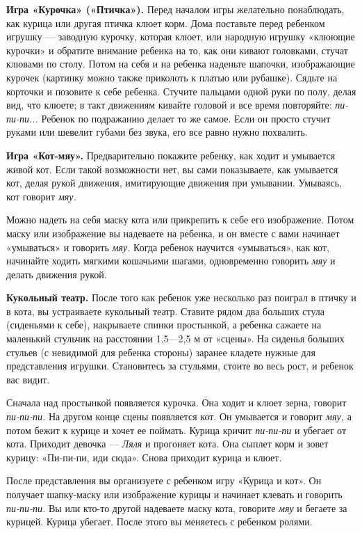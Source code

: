 \documentclass{book}
\renewcommand{\emph}[1]{\textit{#1}}
\begin{document}
\textbf{Игра «Курочка» («Птичка»).} Перед началом игры желательно
понаблюдать, как курица или другая птичка клюет корм. Дома поставьте
перед ребенком игрушку --- заводную курочку, которая клюет, или народную
игрушку «клюющие курочки» и обратите внимание ребенка на то, как они
кивают головками, стучат клювами по столу. Потом на себя и на ребенка
наденьте шапочки, изображающие курочек (картинку можно также приколоть к
платью или рубашке). Сядьте на корточки и позовите к себе ребенка.
Стучите пальцами одной руки по полу, делая вид, что клюете; в такт
движениям кивайте головой и все время повторяйте: \emph{пи-пи-пи...}
Ребенок по подражанию делает то же самое. Если он просто стучит руками
или шевелит губами без звука, его все равно нужно похвалить.

\textbf{Игра «Кот-мяу».} Предварительно покажите ребенку, как ходит и
умывается живой кот. Если такой возможности нет, вы сами показываете,
как умывается кот, делая рукой движения, имитирующие движения при
умывании. Умываясь, кот говорит \emph{мяу.}

Можно надеть на себя маску кота или прикрепить к себе его изображение.
Потом маску или изображение вы надеваете на ребенка, и он вместе с вами
начинает «умываться» и говорить \emph{мяу.} Когда ребенок научится
«умываться», как кот, начинайте ходить мягкими кошачьими шагами,
одновременно говорить \emph{мяу} и делать движения рукой.

\textbf{Кукольный театр.} После того как ребенок уже несколько раз
поиграл в птичку и в кота, вы устраиваете кукольный театр. Ставите рядом
два больших стула (сиденьями к себе), накрываете спинки простынкой, а
ребенка сажаете на маленький стульчик на расстоянии 1,5---2,5 м от
«сцены». На сиденья больших стульев (с невидимой для ребенка стороны)
заранее кладете нужные для представления игрушки. Становитесь за
стульями, стоите во весь рост, и ребенок вас видит.

Сначала над простынкой появляется курочка. Она ходит и клюет зерна,
говорит \emph{пи-пи-пи.} На другом конце сцены появляется кот. Он
умывается и говорит \emph{мяу,} а потом бежит к курице и хочет ее
поймать. Курица кричит \emph{пи-пи-пи} и убегает от кота. Приходит
девочка --- \emph{Ляля} и прогоняет кота. Она сыплет корм и зовет
курицу: «Пи-пи-пи, иди сюда». Снова приходит курица и клюет.

После представления вы организуете с ребенком игру «Курица и кот». Он
получает шапку-маску или изображение курицы и начинает клевать и
говорить \emph{пи-пи-пи.} Вы или кто-то другой надеваете маску кота,
говорите \emph{мяу} и бегаете за курицей. Курица убегает. После этого вы
меняетесь с ребенком ролями.
\end{document}
